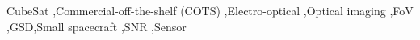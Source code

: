 \documentclass[final,5p,times,twocolumn,authoryear]{elsarticle}
\begin{document}
\begin{frontmatter}

\begin{keyword}
	CubeSat \sep Commercial-off-the-shelf (COTS) \sep  Electro-optical \sep Optical imaging  \sep  FoV \sep GSD\sep Small spacecraft \sep  SNR \sep  Sensor 

\end{keyword}
\end{frontmatter}


\end{document}
